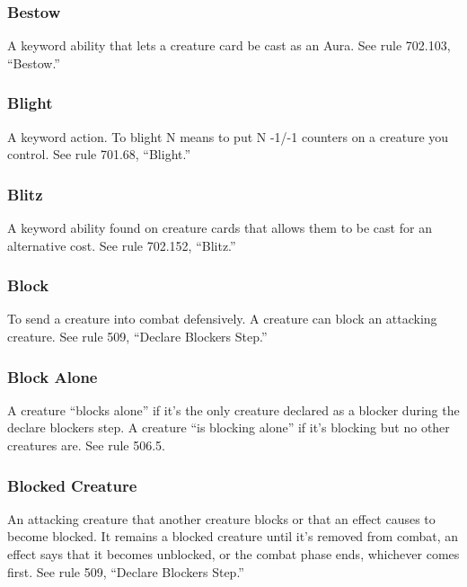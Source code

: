{\subsubsection*{Bestow}

A keyword ability that lets a creature card be cast as an Aura. See rule 702.103, “Bestow.”

\subsubsection*{Blight}

A keyword action. To blight N means to put N -1/-1 counters on a creature you control. See rule 701.68, “Blight.”

\subsubsection*{Blitz}

A keyword ability found on creature cards that allows them to be cast for an alternative cost. See rule 702.152, “Blitz.”

\subsubsection*{Block}

To send a creature into combat defensively. A creature can block an attacking creature. See rule 509, “Declare Blockers Step.”

\subsubsection*{Block Alone}

A creature “blocks alone” if it’s the only creature declared as a blocker during the declare blockers step. A creature “is blocking alone” if it’s blocking but no other creatures are. See rule 506.5.

\subsubsection*{Blocked Creature}

An attacking creature that another creature blocks or that an effect causes to become blocked. It remains a blocked creature until it’s removed from combat, an effect says that it becomes unblocked, or the combat phase ends, whichever comes first. See rule 509, “Declare Blockers Step.”

}
